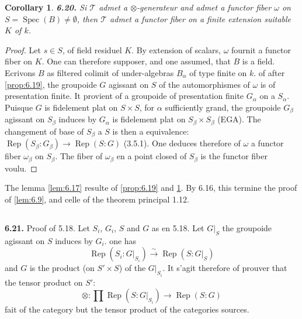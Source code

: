 \documentclass[12pt,a4paper]{article}
\theoremstyle{plain}
\newtheorem{corollary}[theorem]{Corollary}
\theoremstyle{definition}
\theoremstyle{remark}
\DeclareMathOperator{\Spec}{Spec}
\DeclareMathOperator{\Rep}{Rep}
\begin{document}
\begin{corollary}\label{cor:6.20}
\textbf{6.20.} Si $\mathcal{T}$ admet a $\otimes$-generateur and admet a functor fiber $\omega$ on $S = \Spec(B) \neq \emptyset$, then $\mathcal{T}$ admet a functor fiber on a finite extension suitable $K$ of $k$.
\end{corollary}

\begin{proof}
Let $s \in S$, of field residuel $K$. By extension of scalars, $\omega$ fournit a functor fiber on $K$. One can therefore supposer, and one assumed, that $B$ is a field. Ecrivons $B$ as filtered colimit of under-algebras $B_\alpha$ of type finite on $k$. of after \ref{prop:6.19}, the groupoide $G$ agissant on $S$ of the automorphismes of $\omega$ is of presentation finite. It provient of a groupoide of presentation finite $G_\alpha$ on a $S_\alpha$. Puisque $G$ is fidelement plat on $S \times S$, for $\alpha$ sufficiently grand, the groupoide $G_\beta$ agissant on $S_\beta$ induces by $G_\alpha$ is fidelement plat on $S_\beta \times S_\beta$ (EGA). The changement of base of $S_\beta$ a $S$ is then a equivalence: $\Rep(S_\beta:G_\beta) \to \Rep(S:G)$ (3.5.1). One deduces therefore of $\omega$ a functor fiber $\omega_\beta$ on $S_\beta$. The fiber of $\omega_\beta$ en a point closed of $S_\beta$ is the functor fiber voulu.
\end{proof}

The lemma \ref{lem:6.17} resulte of \ref{prop:6.19} and \ref{cor:6.20}. By 6.16, this termine the proof of \ref{lem:6.9}, and celle of the theorem principal 1.12.

\subsection{}

\textbf{6.21.} Proof of 5.18. Let $S_i$, $G_i$, $S$ and $G$ as en 5.18. Let $G|_S$ the groupoide agissant on $S$ induces by $G_i$. one has
\[
\Rep(S_i : G|_{S_i}) \xrightarrow{\sim} \Rep(S:G|_S)
\]
and $G$ is the product (on $S' \times S$) of the $G|_{S_i}$. It s'agit therefore of prouver that the tensor product on $S'$:
\begin{equation}\label{eq:6.21.1}
\otimes : \prod \Rep(S:G|_{S_i}) \to \Rep(S:G)
\end{equation}
fait of the category but the tensor product of the categories sources.
\end{document}

